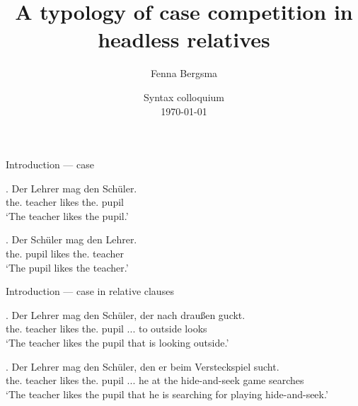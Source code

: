 \documentclass[xcolor=dvipsnames,10pt]{beamer}
\title{A typology of case competition in headless relatives}
\author{Fenna Bergsma}
\date{Syntax colloquium\\ \today}
\institute{Goethe-Universität Frankfurt}
\begin{document}
\begin{frame}
\titlepage

\end{frame}

\begin{frame}{Introduction --- case}

\exg. Der Lehrer mag den Schüler.\\
 the. teacher likes the. pupil\\
 `The teacher likes the pupil.'\label{ex:german-case-1}

\pause

\exg. Der Schüler mag den Lehrer.\\
 the. pupil likes the. teacher\\
 `The pupil likes the teacher.'\label{ex:german-case-2}

\end{frame}


\begin{frame}{Introduction --- case in relative clauses}

\exg. Der Lehrer mag den Schüler, der nach draußen guckt.\\
the. teacher likes the. pupil ... to outside looks\\
`The teacher likes the pupil that is looking outside.'\label{ex:german-relative-1}

\pause

\exg. Der Lehrer mag den Schüler, den er beim Versteckspiel sucht.\\
the. teacher likes the. pupil ... he {at the} {hide-and-seek game} searches\\
`The teacher likes the pupil that he is searching for playing hide-and-seek.'\label{ex:german-relative-2}

\end{frame}
\end{document}
